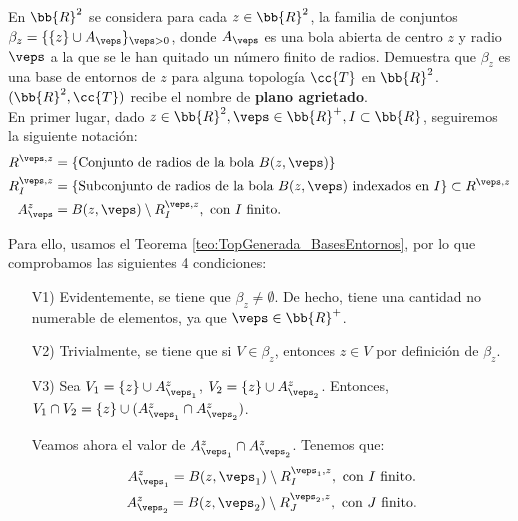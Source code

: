 \begin{ejercicio}
    En $\bb{R}^2$ se considera para cada $z\in \bb{R}^2$, la familia de conjuntos $\beta_z=\{\{z\}\cup A_{\veps}\}_{\veps>0}$, donde $A_{\veps}$ es una bola abierta de centro $z$ y radio $\veps$ a la que se le han quitado un número finito de radios. Demuestra que $\beta_z$ es una base de entornos de $z$ para alguna topología $\cc{T}$ en $\bb{R}^2$. $(\bb{R}^2, \cc{T})$ recibe el nombre de \textbf{plano agrietado}.\\

    En primer lugar, dado $z\in \bb{R}^2, \veps\in \bb{R}^+, I\subset \bb{R}$, seguiremos la siguiente notación:
    \begin{equation*}
        \begin{split}
            R^{\veps,z}&=\{\text{Conjunto de radios de la bola } B(z,\veps)\}\\
            R^{\veps,z}_I&= \{\text{Subconjunto de radios de la bola }B(z,\veps) \text{ indexados en }I\}\subset R^{\veps,z}\\
            A_\veps^z &= B(z,\veps)\setminus R_{I}^{\veps,z},\text{ con }I\text{ finito.}
        \end{split}
    \end{equation*}

    Para ello, usamos el Teorema \ref{teo:TopGenerada_BasesEntornos}, por lo que comprobamos las siguientes 4 condiciones:
    \begin{enumerate}
        \item[V1)] Evidentemente, se tiene que $\beta_z\neq \emptyset$. De hecho, tiene una cantidad no numerable de elementos, ya que $\veps\in \bb{R}^+$.

        \item[V2)] Trivialmente, se tiene que si $V\in \beta_z$, entonces $z\in V$ por definición de $\beta_z$.

        \item[V3)] Sea $V_1=\{z\}\cup A_{\veps_1}^z$, $V_2=\{z\}\cup A_{\veps_2}^z$. Entonces, $V_1\cap V_2=\{z\}\cup (A_{\veps_1}^z\cap A_{\veps_2}^z)$.
        
        Veamos ahora el valor de $A_{\veps_1}^z\cap A_{\veps_2}^z$. Tenemos que:
        \begin{gather*}
            A_{\veps_1}^z=B(z,\veps_1)\setminus R_I^{\veps_1, z},\text{ con $I$ finito.} \\
            A_{\veps_2}^z=B(z,\veps_2)\setminus R_J^{\veps_2, z},\text{ con $J$ finito.}
        \end{gather*}


\end{enumerate}
\end{ejercicio}

